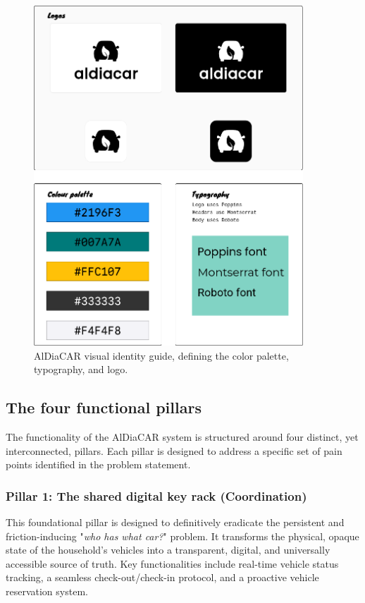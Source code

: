 \begin{figure}[H]
\centering
\includegraphics[width=0.9\textwidth]{images/branding/moodboard.png}
\caption{AlDiaCAR visual identity guide, defining the color palette, typography, and logo.}
\label{fig:visual-identity}
\end{figure}

\subsection{The four functional pillars}
The functionality of the AlDiaCAR system is structured around four distinct, yet interconnected, pillars. Each pillar is designed to address a specific set of pain points identified in the problem statement.

\subsubsection{Pillar 1: The shared digital key rack (Coordination)}
This foundational pillar is designed to definitively eradicate the persistent and friction-inducing "\textit{who has what car?}" problem. It transforms the physical, opaque state of the household's vehicles into a transparent, digital, and universally accessible source of truth. Key functionalities include real-time vehicle status tracking, a seamless check-out/check-in protocol, and a proactive vehicle reservation system.

